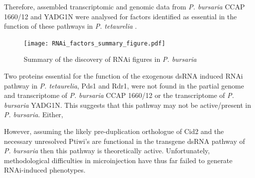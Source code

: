 Therefore, assembled transcriptomic and genomic data from \textit{P. bursaria}
CCAP 1660/12 and YADG1N were analysed for factors identified as essential in the function
of these pathways in \textit{P. tetaurelia} \citep{Marker2014}. 

\begin{figure}
    \texttt{[image: RNAi\_factors\_summary\_figure.pdf]}
    \caption[Summary of RNAi Factors Presence]{Summary of the discovery
    of RNAi figures in \textit{P. bursaria}}
    \label{fig:rnai_summary}
\end{figure}

Two proteins essential for the function of the exogenous dsRNA induced
RNAi pathway in \textit{P. tetaurelia}, Pds1 and Rdr1, were not found in the partial genome and transcriptome 
of \textit{P. bursaria} CCAP 1660/12 or the transcriptome of \textit{P. bursaria} YADG1N.
This suggests that this pathway may not be active/present in \textit{P. bursaria}.
Either, 


However, assuming the likely pre-duplication orthologue of Cid2 and the necessary 
unresolved Ptiwi's are functional
in the transgene dsRNA pathway of \textit{P. bursaria}
then this pathway is theoretically active.  Unfortunately, methodological
difficulties in microinjection have thus far failed to generate RNAi-induced
phenotypes.
